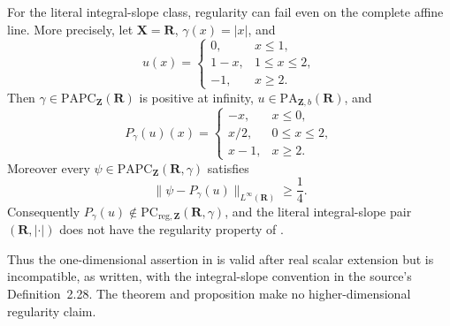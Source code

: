 \begin{proposition}
\label{prop:frontier-polyhedral-integral-regularity-counterexample}
For the literal integral-slope class, regularity can fail even on the complete
affine line.  More precisely, let $\mathbf X=\mathbf R$,
$\gamma(x)=|x|$, and
\[
 u(x)=
 \begin{cases}
  0,&x\leq1,\\
  1-x,&1\leq x\leq2,\\
  -1,&x\geq2.
 \end{cases}
\]
Then $\gamma\in\mathrm{PAPC}_{\mathbf Z}(\mathbf R)$ is positive at infinity,
$u\in\mathrm{PA}_{\mathbf Z,b}(\mathbf R)$, and
\[
 P_\gamma(u)(x)=
 \begin{cases}
  -x,&x\leq0,\\
  x/2,&0\leq x\leq2,\\
  x-1,&x\geq2.
 \end{cases}
\]
Moreover every
$\psi\in\mathrm{PAPC}_{\mathbf Z}(\mathbf R,\gamma)$ satisfies
\[
 \lVert\psi-P_\gamma(u)\rVert_{L^\infty(\mathbf R)}\geq\frac14.
\]
Consequently
$P_\gamma(u)\notin\mathrm{PC}_{\mathrm{reg},\mathbf Z}
(\mathbf R,\gamma)$, and the literal integral-slope pair
$(\mathbf R,|\cdot|)$ does not have the regularity property of
\cite[Theorem~6.4 and Definition~6.5]{BMPS26}.
\end{proposition}

Thus the one-dimensional assertion in
\cite[Proposition~6.13]{BMPS26} is valid after real scalar extension but is
incompatible, as written, with the integral-slope convention in the source's
Definition~2.28.  The theorem and proposition make no higher-dimensional
regularity claim.
